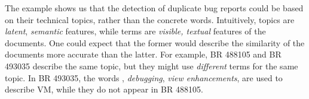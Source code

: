 





The example shows us that the detection of duplicate bug reports
could be based on their technical topics, rather than the concrete
words. Intuitively, topics are \emph{latent}, {\em
  semantic} features, while terms are \emph{visible, textual} features
of the documents. One could expect that the former would describe the
similarity of the documents more accurate than the latter. For
example, BR 488105 and BR 493035 describe the same topic, but they
might use \emph{different} terms for the same topic. In BR 493035, the
words , {\em debugging}, {\em view enhancements}, are used
to describe VM, while they do not appear in BR 488105.





